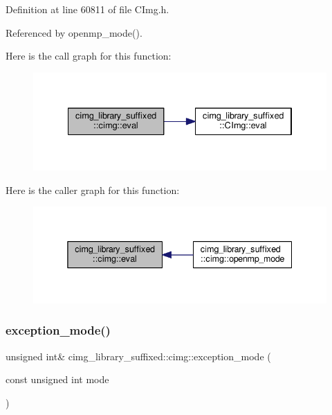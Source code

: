 Definition at line 60811 of file C\+Img.\+h.



Referenced by openmp\+\_\+mode().

Here is the call graph for this function\+:
\nopagebreak
\begin{figure}[H]
\begin{center}
\leavevmode
\includegraphics[width=334pt]{d4/d9b/namespacecimg__library__suffixed_1_1cimg_a4574a27654d00ba42a108368fa9d7e64_cgraph}
\end{center}
\end{figure}
Here is the caller graph for this function\+:
\nopagebreak
\begin{figure}[H]
\begin{center}
\leavevmode
\includegraphics[width=338pt]{d4/d9b/namespacecimg__library__suffixed_1_1cimg_a4574a27654d00ba42a108368fa9d7e64_icgraph}
\end{center}
\end{figure}
\mbox{\label{namespacecimg__library__suffixed_1_1cimg_aeafab144366eddd11360f32f468fa4af}} 
\subsubsection{\texorpdfstring{exception\+\_\+mode()}{exception\_mode()}\hspace{0.1cm}{\footnotesize\ttfamily [1/2]}}
{\footnotesize\ttfamily unsigned int\& cimg\+\_\+library\+\_\+suffixed\+::cimg\+::exception\+\_\+mode (\begin{DoxyParamCaption}\item[{const unsigned int}]{mode }\end{DoxyParamCaption})\hspace{0.3cm}{\ttfamily [inline]}}



